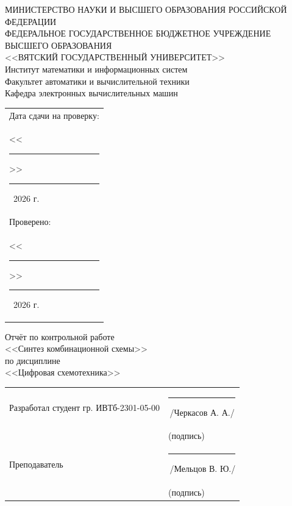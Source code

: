 \documentclass[oneside,a4paper,14pt]{extarticle}
\begin{document}
\newpage
\thispagestyle{empty}
\begin{center}
  МИНИСТЕРСТВО НАУКИ И ВЫСШЕГО ОБРАЗОВАНИЯ РОССИЙСКОЙ ФЕДЕРАЦИИ\\
  ФЕДЕРАЛЬНОЕ ГОСУДАРСТВЕННОЕ БЮДЖЕТНОЕ УЧРЕЖДЕНИЕ ВЫСШЕГО ОБРАЗОВАНИЯ\\
  <<ВЯТСКИЙ ГОСУДАРСТВЕННЫЙ УНИВЕРСИТЕТ>>\\
  Институт математики и информационных систем\\
  Факультет автоматики и вычислительной техники\\
  Кафедра электронных вычислительных машин
\end{center}
\vspace{10mm}

\hfill
\begin{tabular}{l}
  \footnotesize Дата сдачи на проверку:                                          \\
  \footnotesize <<\rule[-1mm]{5mm}{0.10mm}\/>>\rule[-1mm]{20mm}{0.10mm}\ 2026 г. \\
  \footnotesize Проверено:                                                       \\
  \footnotesize <<\rule[-1mm]{5mm}{0.10mm}\/>>\rule[-1mm]{20mm}{0.10mm}\ 2026 г. \\
\end{tabular}
\vfill

\begin{center}
  Отчёт по контрольной работе\\
  <<Синтез комбинационной схемы>>\\
  по дисциплине\\
  <<Цифровая схемотехника>>\\
\end{center}
\vspace{25mm}
\noindent
\begin{tabular}{ll}
  Разработал студент гр. ИВТб-2301-05-00 & \hspace{5mm}\rule[-1mm]{30mm}{0.10mm}\,/Черкасов А. А./ \\
                                           & \hspace{12.5mm}\footnotesize(подпись)                   \\
  Преподаватель                            & \hspace{5mm}\rule[-1mm]{30mm}{0.10mm}\,/Мельцов В. Ю./  \\
                                           & \hspace{12.5mm}\footnotesize(подпись)                   \\
\end{tabular}
\end{document}
